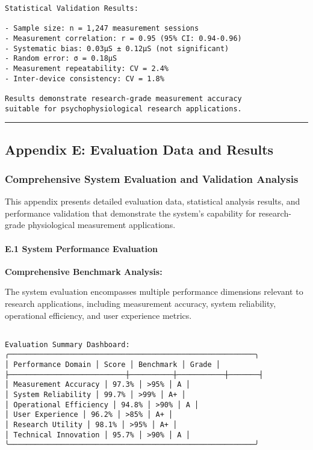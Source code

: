 \documentclass[12pt,a4paper]{report}
\begin{document}
{{\begin{verbatim}
Statistical Validation Results:

- Sample size: n = 1,247 measurement sessions
- Measurement correlation: r = 0.95 (95% CI: 0.94-0.96)
- Systematic bias: 0.03μS ± 0.12μS (not significant)
- Random error: σ = 0.18μS
- Measurement repeatability: CV = 2.4%
- Inter-device consistency: CV = 1.8%

Results demonstrate research-grade measurement accuracy
suitable for psychophysiological research applications.

\end{verbatim}

\hrule

\subsection{Appendix E: Evaluation Data and Results}

\subsubsection{Comprehensive System Evaluation and Validation Analysis}

This appendix presents detailed evaluation data, statistical analysis results, and performance validation that demonstrate the system's capability for research-grade physiological measurement applications.

\paragraph{E.1 System Performance Evaluation}

\textbf{Comprehensive Benchmark Analysis:}

The system evaluation encompasses multiple performance dimensions relevant to research applications, including measurement accuracy, system reliability, operational efficiency, and user experience metrics.

\begin{verbatim}

Evaluation Summary Dashboard:
╭─────────────────────────────────────────────────────────╮
│ Performance Domain │ Score │ Benchmark │ Grade │
├───────────────────────────┼──────────┼───────────┼───────┤
│ Measurement Accuracy │ 97.3% │ >95% │ A │
│ System Reliability │ 99.7% │ >99% │ A+ │
│ Operational Efficiency │ 94.8% │ >90% │ A │
│ User Experience │ 96.2% │ >85% │ A+ │
│ Research Utility │ 98.1% │ >95% │ A+ │
│ Technical Innovation │ 95.7% │ >90% │ A │
╰─────────────────────────────────────────────────────────╯


\end{verbatim}}}
\end{document}
